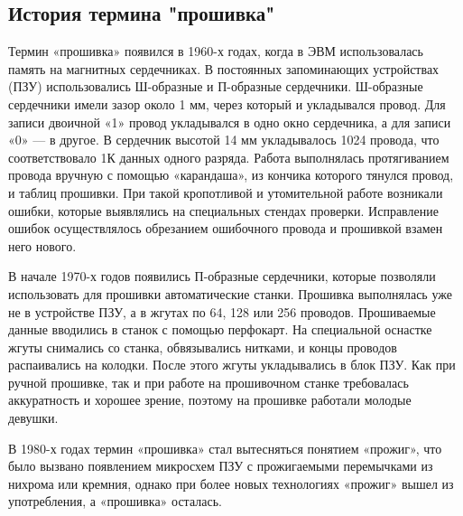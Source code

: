 \subsection{История термина "прошивка"}
Термин «прошивка» появился в 1960-х годах, когда в ЭВМ использовалась память на магнитных сердечниках. В постоянных запоминающих устройствах (ПЗУ) использовались Ш-образные и П-образные сердечники. Ш-образные сердечники имели зазор около 1 мм, через который и укладывался провод. Для записи двоичной «1» провод укладывался в одно окно сердечника, а для записи «0» — в другое. В сердечник высотой 14 мм укладывалось 1024 провода, что соответствовало 1К данных одного разряда. Работа выполнялась протягиванием провода вручную с помощью «карандаша», из кончика которого тянулся провод, и таблиц прошивки. При такой кропотливой и утомительной работе возникали ошибки, которые выявлялись на специальных стендах проверки. Исправление ошибок осуществлялось обрезанием ошибочного провода и прошивкой взамен него нового.

В начале 1970-х годов появились П-образные сердечники, которые позволяли использовать для прошивки автоматические станки. Прошивка выполнялась уже не в устройстве ПЗУ, а в жгутах по 64, 128 или 256 проводов. Прошиваемые данные вводились в станок с помощью перфокарт. На специальной оснастке жгуты снимались со станка, обвязывались нитками, и концы проводов распаивались на колодки. После этого жгуты укладывались в блок ПЗУ. Как при ручной прошивке, так и при работе на прошивочном станке требовалась аккуратность и хорошее зрение, поэтому на прошивке работали молодые девушки.

В 1980-х годах термин «прошивка» стал вытесняться понятием «прожиг», что было вызвано появлением микросхем ПЗУ с прожигаемыми перемычками из нихрома или кремния, однако при более новых технологиях «прожиг» вышел из употребления, а «прошивка» осталась.
